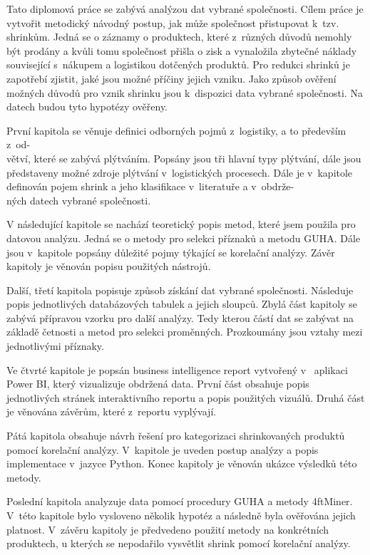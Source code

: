 Tato diplomová práce se zabývá analýzou dat vybrané společnosti. Cílem práce je vytvořit metodický návodný postup, jak může společnost přistupovat k~tzv. shrinkům.
Jedná se o záznamy o produktech, které z~různých důvodů nemohly být prodány a kvůli tomu společnost přišla o zisk a vynaložila zbytečné náklady související s~nákupem a logistikou dotčených produktů. 
Pro redukci shrinků je zapotřebí zjistit, jaké jsou možné příčiny jejich vzniku.
Jako způsob ověření možných důvodů pro vznik shrinku jsou k~dispozici data vybrané společnosti. Na datech budou tyto hypotézy ověřeny. 

První kapitola se věnuje definici odborných pojmů z~logistiky, a to především z~od-\\větví, které se zabývá plýtváním. Popsány jsou tři hlavní typy plýtvání, dále jsou představeny možné zdroje plýtvání v~logistických procesech. Dále je v~kapitole definován pojem shrink a jeho klasifikace v~literatuře a v~obdrže-\\ných datech vybrané společnosti.


V následující kapitole se nachází teoretický popis metod, které jsem použila pro datovou analýzu. Jedná se o metody pro selekci příznaků a metodu GUHA. Dále jsou v~kapitole popsány důležité pojmy týkající se korelační analýzy. Závěr kapitoly je věnován popisu použitých nástrojů.

Další, třetí kapitola popisuje způsob získání dat vybrané společnosti. Následuje popis jednotlivých databázových tabulek a jejich sloupců. Zbylá část kapitoly se zabývá přípravou vzorku pro další analýzy. Tedy kterou částí dat se zabývat na základě četnosti a metod pro selekci proměnných. Prozkoumány jsou vztahy mezi jednotlivými příznaky.

Ve čtvrté kapitole je popsán business intelligence report vytvořený v~ aplikaci Power BI, který vizualizuje obdržená data. První část obsahuje popis jednotlivých stránek interaktivního reportu a popis použitých vizuálů. Druhá část je věnována závěrům, které z~reportu vyplývají.

Pátá kapitola obsahuje návrh řešení pro kategorizaci shrinkovaných produktů pomocí korelační analýzy. V~kapitole je uveden postup analýzy a popis implementace v~jazyce Python. Konec kapitoly je věnován ukázce výsledků této metody.

Poslední kapitola analyzuje data pomocí procedury GUHA a metody 4ftMiner. V~této kapitole bylo vysloveno několik hypotéz a následně byla ověřována jejich platnost. V~závěru kapitoly je předvedeno použití metody na konkrétních produktech, u kterých se nepodařilo vysvětlit shrink pomocí korelační analýzy.

